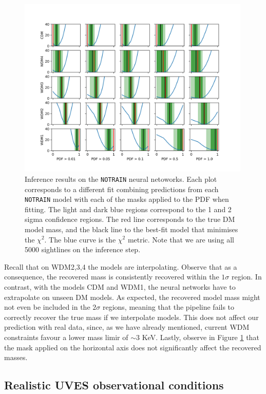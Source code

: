 \begin{figure}
    \centering
    \includegraphics[width=0.99\textwidth]{img/ML/inference_no_train.png}
    \caption{Inference results on the \texttt{NOTRAIN} neural netoworks. Each plot corresponds to a different fit combining predictions from each \texttt{NOTRAIN} model with each of the masks applied to the PDF when fitting. The light and dark blue regions correspond to the 1 and 2 sigma confidence regions. The red line corresponds to the true DM model mass, and the black line to the best-fit model that minimises the $\chi^2$. The blue curve is the $\chi^2$ metric. Note that we are using all 5000 sightlines on the inference step.}
    \label{fig:inference no train}
\end{figure}
Recall that on WDM2,3,4 the models are interpolating. Observe that as a consequence, the recovered mass is consistently recovered within the $1\sigma$ region. In contrast, with the models CDM and WDM1, the neural networks have to extrapolate on unseen DM models. As expected, the recovered model mass might not even be included in the $2\sigma$ regions, meaning that the pipeline fails to correctly recover the true mass if we interpolate models. This does not affect our prediction with real data, since, as we have already mentioned, current WDM constraints favour a lower mass limir of $\sim 3$ KeV. Lastly, observe in Figure \ref{fig:inference no train} that the mask applied on the horizontal axis does not significantly affect the recovered masses.


\subsection{Realistic UVES observational conditions}\label{sec:hires test}

